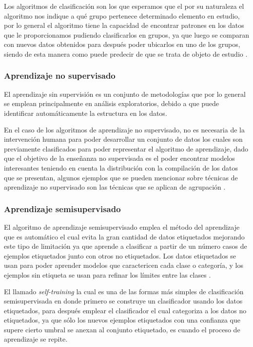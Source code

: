 Los algoritmos de clasificación son los que esperamos que el por su naturaleza el algoritmo nos indique a qué grupo pertenece determinado elemento en estudio, por lo general el algoritmo tiene la capacidad de encontrar patrones en los datos que le proporcionamos pudiendo clasificarlos en grupos, ya que luego se comparan con nuevos datos obtenidos para después poder ubicarlos en uno de los grupos, siendo de esta manera como puede predecir de que se trata de objeto de estudio \cite{gonzalez2015}. 
 
\subsubsection{Aprendizaje no supervisado}

El aprendizaje sin supervisión es un conjunto de metodologías que por lo general se emplean principalmente en análisis exploratorios, debido a que puede identificar automáticamente la estructura en los datos.

En el caso de los algoritmos de aprendizaje no supervisado, no es necesaria de la  intervención humana para poder desarrollar un conjunto de datos  los cuales son previamente clasificados para poder representar el algoritmo de aprendizaje, dado que el objetivo de la enseñanza no supervisada es el poder encontrar modelos interesantes teniendo en cuenta la distribución con la compilación de los datos que se presentan, algunos ejemplos que se pueden mencionar sobre técnicas de aprendizaje no supervisado son las técnicas que se aplican de agrupación \cite{GonzalezPerez2020}.

\subsubsection{Aprendizaje semisupervisado}

El algoritmo de aprendizaje semisupervisado emplea el método del aprendizaje que es automático el cual evita la gran cantidad de datos etiquetados mejorando este tipo de limitación ya que aprende a clasificar a partir de un número casos de ejemplos etiquetados junto con otros no etiquetados. Los datos etiquetados se usan para poder aprender modelos que caractericen cada clase o categoría, y los ejemplos sin etiqueta se usan para refinar los límites entre las clases \cite{Cardoso2020Apr}.

El llamado \textit{self-training} la cual es una de las formas más simples de clasificación semisupervisada en donde primero se construye un clasificador usando los datos etiquetados, para después emplear el clasificador el cual categoriza a los datos no etiquetados, ya que sólo los nuevos ejemplos etiquetados con una confianza que supere cierto umbral se anexan al conjunto etiquetado, es cuando el proceso de aprendizaje se repite.

